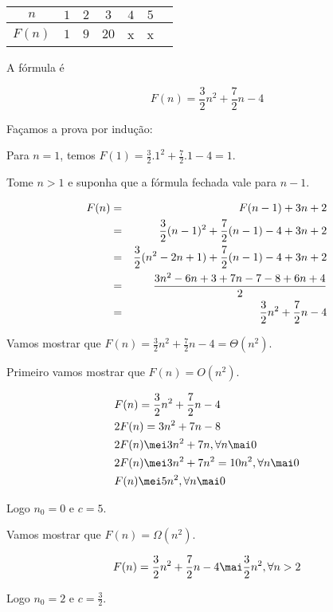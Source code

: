 \documentclass[a4paper]{memoir}
\begin{document}
\begin{sol}

\begin{center}
\begin{tabular}{|c*{6}{|c}}
\hline
$n$ & $1$ & $2$ & $3$ & $4$ & $5$\\ \hline
$F(n)$ & $1$ & $9$ & $20$ & x & x\\ \hline
\end{tabular}
\end{center}

A fórmula é

\[
F(n) = \frac{3}{2}n^2 + \frac{7}{2}n - 4
\]

Façamos a prova por indução:

Para $n = 1$, temos $F(1) = \frac{3}{2}.1^2 + \frac{7}{2}.1 - 4 = 1$.

Tome $n > 1$ e suponha que a fórmula fechada vale para $n-1$.

\begin{eqnarray*}
  F(n) &=& F(n - 1) + 3n + 2 \hfill \\
   &=& \frac{3}{2}(n - 1)^2  + \frac{7}{2}(n - 1) - 4 + 3n + 2 \hfill \\
   &=& \frac{3}{2}(n^2  - 2n + 1) + \frac{7}{2}(n - 1) - 4 + 3n + 2 \hfill \\
   &=& \frac{{3n^2  - 6n + 3 + 7n - 7 - 8 + 6n + 4}}{2} \hfill \\
   &=& \frac{3}{2}n^2  + \frac{7}{2}n - 4 \hfill \\ 
\end{eqnarray*} 

\newpage 

Vamos mostrar que $F(n) = \frac{3}{2}n^2 + \frac{7}{2}n - 4 = \Theta(n^2)$.

Primeiro vamos mostrar que $F(n) = O(n^2)$.

\[
\begin{gathered}
  F(n) = \frac{3}{2}n^2  + \frac{7}{2}n - 4 \hfill \\
  2F(n) = 3n^2  + 7n - 8 \hfill \\
  2F(n) \mei 3n^2  + 7n,\forall n \mai 0 \hfill \\
  2F(n) \mei 3n^2  + 7n^2  = 10n^2 ,\forall n \mai 0 \hfill \\
  F(n) \mei 5n^2 ,\forall n \mai 0 \hfill \\ 
\end{gathered} 
\]

Logo $n_0 = 0$ e $c = 5$.

Vamos mostrar que $F(n) = \Omega(n^2)$.

\[
F(n) = \frac{3}{2}n^2  + \frac{7}{2}n - 4 \mai \frac{3}{2}n^2 ,\forall n > 2
\]

Logo $n_0 = 2$ e $c = \frac{3}{2}$.

\end{sol}
\end{document}
